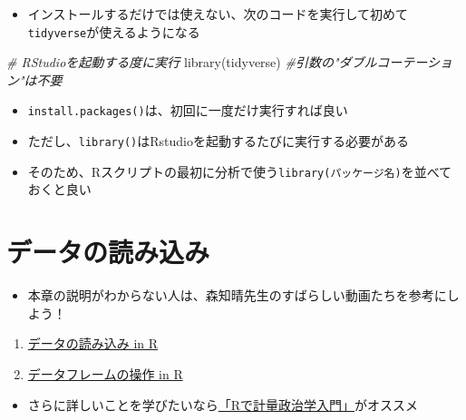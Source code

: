 \documentclass[
]{book}
\newenvironment{Shaded}{\begin{snugshade}}{\end{snugshade}}
\newcommand{\CommentTok}[1]{\textcolor[rgb]{0.56,0.35,0.01}{\textit{#1}}}
\newcommand{\FunctionTok}[1]{\textcolor[rgb]{0.00,0.00,0.00}{#1}}
\newcommand{\NormalTok}[1]{#1}
\providecommand{\tightlist}{%
  \setlength{\itemsep}{0pt}\setlength{\parskip}{0pt}}
\begin{document}
\begin{itemize}
\tightlist
\item
  インストールするだけでは使えない、次のコードを実行して初めて\texttt{tidyverse}が使えるようになる
\end{itemize}

\begin{Shaded}
\begin{Highlighting}[]
\CommentTok{\# RStudioを起動する度に実行}
\FunctionTok{library}\NormalTok{(tidyverse) }\CommentTok{\#引数の"ダブルコーテーション"は不要}
\end{Highlighting}
\end{Shaded}

\begin{itemize}
\tightlist
\item
  \texttt{install.packages()}は、初回に一度だけ実行すれば良い
\item
  ただし、\texttt{library()}はRstudioを起動するたびに実行する必要がある
\item
  そのため、Rスクリプトの最初に分析で使う\texttt{library(パッケージ名)}を並べておくと良い
\end{itemize}

\hypertarget{ux30c7ux30fcux30bfux306eux8aadux307fux8fbcux307f}{%
\chapter{データの読み込み}\label{ux30c7ux30fcux30bfux306eux8aadux307fux8fbcux307f}}

\begin{itemize}
\tightlist
\item
  本章の説明がわからない人は、森知晴先生のすばらしい動画たちを参考にしよう！
\end{itemize}

\begin{enumerate}
\def\labelenumi{\arabic{enumi}.}
\tightlist
\item
  \href{https://youtu.be/FugazO_rL7c}{データの読み込み in R}\\
\item
  \href{https://youtu.be/96AZJmGNass}{データフレームの操作 in R}
\end{enumerate}

\begin{itemize}
\tightlist
\item
  さらに詳しいことを学びたいなら\href{https://shohei-doi.github.io/quant_polisci/index.html}{「Rで計量政治学入門」}がオススメ
\end{itemize}
\end{document}
